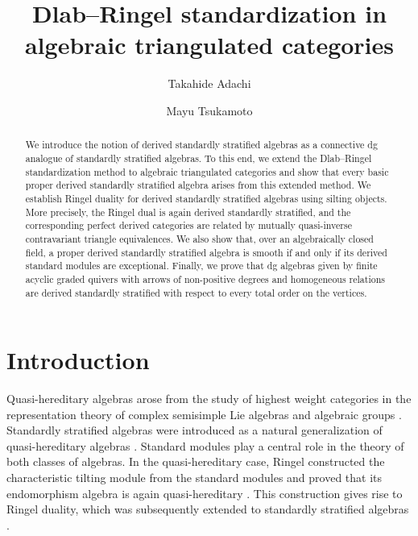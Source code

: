 \documentclass[a4paper,reqno,11pt]{amsart}
\numberwithin{equation}{section}
\theoremstyle{definition}
\begin{document}
\title{Dlab--Ringel standardization in algebraic triangulated categories}
\author{Takahide Adachi}
\address{T.~Adachi: Faculty of Global and Science Studies, Yamaguchi University, 1677-1 Yoshida, Yamaguchi 753-8511, Japan}
\author{Mayu Tsukamoto}
\address{M.~Tsukamoto: Graduate School of Mathematics, Nagoya University, Furo-cho, Chikusa-ku, Nagoya, Aichi 464-8602, Japan}


\begin{abstract}
We introduce the notion of derived standardly stratified algebras as a connective dg analogue of standardly stratified algebras. To this end, we extend the Dlab--Ringel standardization method to algebraic triangulated categories and show that every basic proper derived standardly stratified algebra arises from this extended method. We establish Ringel duality for derived standardly stratified algebras using silting objects. More precisely, the Ringel dual is again derived standardly stratified, and the corresponding perfect derived categories are related by mutually quasi-inverse contravariant triangle equivalences. We also show that, over an algebraically closed field, a proper derived standardly stratified algebra is smooth if and only if its derived standard modules are exceptional. Finally, we prove that dg algebras given by finite acyclic graded quivers with arrows of non-positive degrees and homogeneous relations are derived standardly stratified with respect to every total order on the vertices.
\end{abstract}

\maketitle



\section{Introduction}

Quasi-hereditary algebras arose from the study of highest weight categories in the representation theory of complex semisimple Lie algebras and algebraic groups \cite{S87,CPS88}.
Standardly stratified algebras were introduced as a natural generalization of quasi-hereditary algebras \cite{CPS96,Dl96}.
Standard modules play a central role in the theory of both classes of algebras.
In the quasi-hereditary case, Ringel constructed the characteristic tilting module from the standard modules and proved that its endomorphism algebra is again quasi-hereditary \cite{R91}.
This construction gives rise to Ringel duality, which was subsequently extended to standardly stratified algebras \cite{AHLU00,Xi02}.
\end{document}

